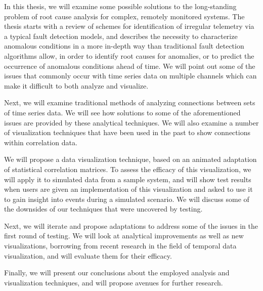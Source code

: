 In this thesis, we will examine some possible solutions to the long-standing problem of root cause analysis for complex, remotely monitored systems. The thesis starts with a review of schemes for identification of irregular telemetry via a typical fault detection models, and describes the necessity to characterize anomalous conditions in a more in-depth way than traditional fault detection algorithms allow, in order to identify root causes for anomalies, or to predict the occurrence of anomalous conditions ahead of time. We will point out some of the issues that commonly occur with time series data on multiple channels which can make it difficult to both analyze and visualize.

Next, we will examine traditional methods of analyzing connections between sets of time series data. We will see how solutions to some of the aforementioned issues are provided by these analytical techniques. We will also examine a number of visualization techniques that have been used in the past to show connections within correlation data.

We will propose a data visualization technique, based on an animated adaptation of statistical correlation matrices. To assess the efficacy of this visualization, we will apply it to simulated data from a sample system, and will show test results when users are given an implementation of this visualization and asked to use it to gain insight into events during a simulated scenario. We will discuss some of the downsides of our techniques that were uncovered by testing.

Next, we will iterate and propose adaptations to address some of the issues in the first round of testing. We will look at analytical improvements as well as new visualizations, borrowing from recent research in the field of temporal data visualization, and will evaluate them for their efficacy.

Finally, we will present our conclusions about the employed analysis and visualization techniques, and will propose avenues for further research.